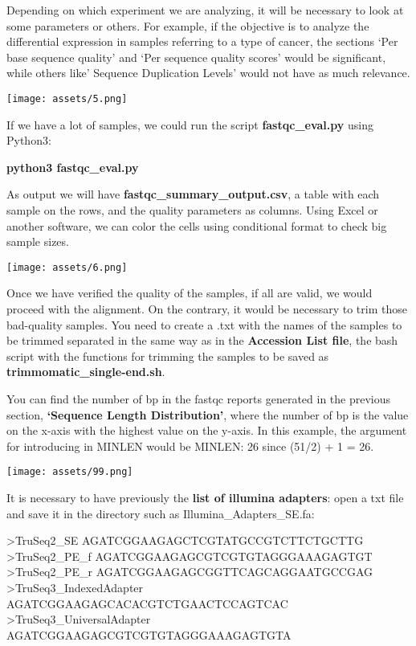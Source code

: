 \documentclass[
]{article}
\newenvironment{Shaded}{\begin{snugshade}}{\end{snugshade}}
\newcommand{\NormalTok}[1]{#1}
\begin{document}
Depending on which experiment we are analyzing, it will be necessary to
look at some parameters or others. For example, if the objective is to
analyze the differential expression in samples referring to a type of
cancer, the sections `Per base sequence quality' and `Per sequence
quality scores' would be significant, while others like' Sequence
Duplication Levels' would not have as much relevance.

\texttt{[image: assets/5.png]}

If we have a lot of samples, we could run the script
\textbf{fastqc\_eval.py} using Python3:

\textbf{python3 fastqc\_eval.py}

As output we will have \textbf{fastqc\_summary\_output.csv}, a table
with each sample on the rows, and the quality parameters as columns.
Using Excel or another software, we can color the cells using
conditional format to check big sample sizes.

\texttt{[image: assets/6.png]}

Once we have verified the quality of the samples, if all are valid, we
would proceed with the alignment. On the contrary, it would be necessary
to trim those bad-quality samples. You need to create a .txt with the
names of the samples to be trimmed separated in the same way as in the
\textbf{Accession List file}, the bash script with the functions for
trimming the samples to be saved as \textbf{trimmomatic\_single-end.sh}.

You can find the number of bp in the fastqc reports generated in the
previous section, \textbf{`Sequence Length Distribution'}, where the
number of bp is the value on the x-axis with the highest value on the
y-axis. In this example, the argument for introducing in MINLEN would be
MINLEN: 26 since (51/2) + 1 = 26.

\texttt{[image: assets/99.png]}

It is necessary to have previously the \textbf{list of illumina
adapters}: open a txt file and save it in the directory such as
Illumina\_Adapters\_SE.fa:

\begin{Shaded}
\begin{Highlighting}[]
\NormalTok{\textgreater{}TruSeq2\_SE}
\NormalTok{AGATCGGAAGAGCTCGTATGCCGTCTTCTGCTTG}
\NormalTok{\textgreater{}TruSeq2\_PE\_f}
\NormalTok{AGATCGGAAGAGCGTCGTGTAGGGAAAGAGTGT}
\NormalTok{\textgreater{}TruSeq2\_PE\_r}
\NormalTok{AGATCGGAAGAGCGGTTCAGCAGGAATGCCGAG}
\NormalTok{\textgreater{}TruSeq3\_IndexedAdapter}
\NormalTok{AGATCGGAAGAGCACACGTCTGAACTCCAGTCAC}
\NormalTok{\textgreater{}TruSeq3\_UniversalAdapter}
\NormalTok{AGATCGGAAGAGCGTCGTGTAGGGAAAGAGTGTA}
\end{Highlighting}
\end{Shaded}
\end{document}
